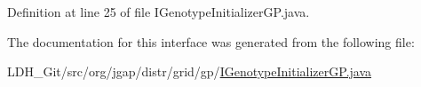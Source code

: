 Definition at line 25 of file I\-Genotype\-Initializer\-G\-P.\-java.



The documentation for this interface was generated from the following file\-:\begin{DoxyCompactItemize}
\item 
L\-D\-H\-\_\-\-Git/src/org/jgap/distr/grid/gp/\hyperlink{_i_genotype_initializer_g_p_8java}{I\-Genotype\-Initializer\-G\-P.\-java}\end{DoxyCompactItemize}
